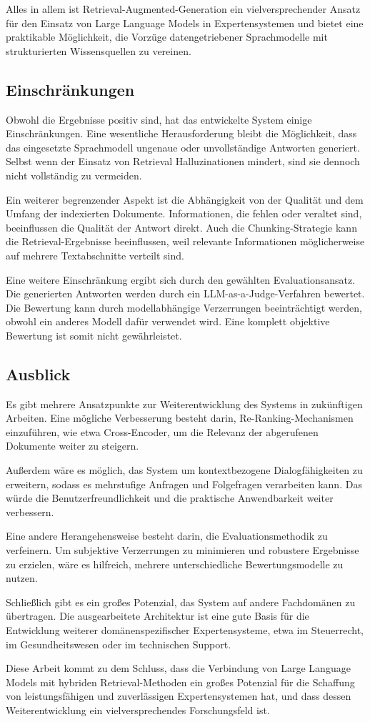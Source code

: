 Alles in allem ist Retrieval-Augmented-Generation ein vielversprechender Ansatz für den Einsatz von Large Language Models in Expertensystemen und bietet eine praktikable Möglichkeit, die Vorzüge datengetriebener Sprachmodelle mit strukturierten Wissensquellen zu vereinen.
\subsection{Einschränkungen}
Obwohl die Ergebnisse positiv sind, hat das entwickelte System einige Einschränkungen. Eine wesentliche Herausforderung bleibt die Möglichkeit, dass das eingesetzte Sprachmodell ungenaue oder unvollständige Antworten generiert.  Selbst wenn der Einsatz von Retrieval Halluzinationen mindert, sind sie dennoch nicht vollständig zu vermeiden.

Ein weiterer begrenzender Aspekt ist die Abhängigkeit von der Qualität und dem Umfang der indexierten Dokumente. Informationen, die fehlen oder veraltet sind, beeinflussen die Qualität der Antwort direkt. Auch die Chunking-Strategie kann die Retrieval-Ergebnisse beeinflussen, weil relevante Informationen möglicherweise auf mehrere Textabschnitte verteilt sind.

Eine weitere Einschränkung ergibt sich durch den gewählten Evaluationsansatz. Die generierten Antworten werden durch ein LLM-as-a-Judge-Verfahren bewertet. Die Bewertung kann durch modellabhängige Verzerrungen beeinträchtigt werden, obwohl ein anderes Modell dafür verwendet wird. Eine komplett objektive Bewertung ist somit nicht gewährleistet.
\subsection{Ausblick }
Es gibt mehrere Ansatzpunkte zur Weiterentwicklung des Systems in zukünftigen Arbeiten. Eine mögliche Verbesserung besteht darin, Re-Ranking-Mechanismen einzuführen, wie etwa Cross-Encoder, um die Relevanz der abgerufenen Dokumente weiter zu steigern.

Außerdem wäre es möglich, das System um kontextbezogene Dialogfähigkeiten zu erweitern, sodass es mehrstufige Anfragen und Folgefragen verarbeiten kann.  Das würde die Benutzerfreundlichkeit und die praktische Anwendbarkeit weiter verbessern.

Eine andere Herangehensweise besteht darin, die Evaluationsmethodik zu verfeinern. Um subjektive Verzerrungen zu minimieren und robustere Ergebnisse zu erzielen, wäre es hilfreich, mehrere unterschiedliche Bewertungsmodelle zu nutzen.

Schließlich gibt es ein großes Potenzial, das System auf andere Fachdomänen zu übertragen. Die ausgearbeitete Architektur ist eine gute Basis für die Entwicklung weiterer domänenspezifischer Expertensysteme, etwa im Steuerrecht, im Gesundheitswesen oder im technischen Support.

Diese Arbeit kommt zu dem Schluss, dass die Verbindung von Large Language Models mit hybriden Retrieval-Methoden ein großes Potenzial für die Schaffung von leistungsfähigen und zuverlässigen Expertensystemen hat, und dass dessen Weiterentwicklung ein vielversprechendes Forschungsfeld ist.
\label{sec:Fazit und Ausblick} 